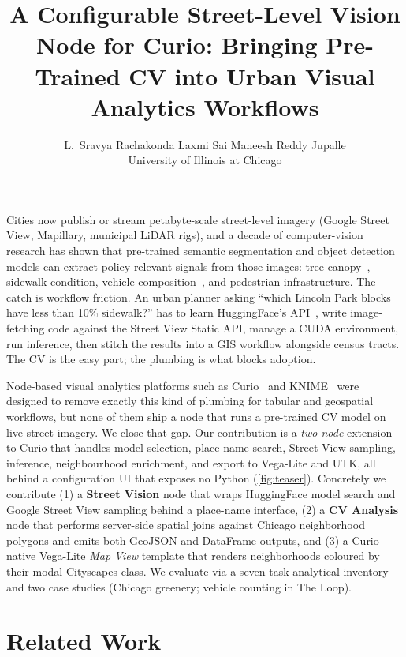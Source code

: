 \documentclass[journal]{vgtc}                     %
\title{A Configurable Street-Level Vision Node for Curio: Bringing Pre-Trained CV into Urban Visual Analytics Workflows}
\author{%
  L.~Sravya Rachakonda \hspace{2.5em} Laxmi Sai Maneesh Reddy Jupalle
  \\[4pt]
  \normalfont University of Illinois at Chicago
}
\begin{document}

\maketitle

Cities now publish or stream petabyte-scale street-level imagery (Google Street View, Mapillary, municipal LiDAR rigs), and a decade of computer-vision research has shown that pre-trained semantic segmentation and object detection models can extract policy-relevant signals from those images: tree canopy~\cite{Li2015AssessingStreetlevelUrban}, sidewalk condition, vehicle composition~\cite{Gebru2017UsingDeepLearning}, and pedestrian infrastructure. The catch is workflow friction. An urban planner asking ``which Lincoln Park blocks have less than 10\% sidewalk?'' has to learn HuggingFace's API~\cite{Wolf2020TransformersStateoftheartNatural}, write image-fetching code against the Street View Static API, manage a CUDA environment, run inference, then stitch the results into a GIS workflow alongside census tracts. The CV is the easy part; the plumbing is what blocks adoption.

Node-based visual analytics platforms such as Curio~\cite{Moreira2024CurioDataflowFramework} and KNIME~\cite{Berthold2009KNIMEKonstanzInformation} were designed to remove exactly this kind of plumbing for tabular and geospatial workflows, but none of them ship a node that runs a pre-trained CV model on live street imagery. We close that gap. Our contribution is a \emph{two-node} extension to Curio that handles model selection, place-name search, Street View sampling, inference, neighbourhood enrichment, and export to Vega-Lite and UTK, all behind a configuration UI that exposes no Python (\autoref{fig:teaser}). Concretely we contribute (1) a \textbf{Street Vision} node that wraps HuggingFace model search and Google Street View sampling behind a place-name interface, (2) a \textbf{CV Analysis} node that performs server-side spatial joins against Chicago neighborhood polygons and emits both GeoJSON and DataFrame outputs, and (3) a Curio-native Vega-Lite \emph{Map View} template that renders neighborhoods coloured by their modal Cityscapes class. We evaluate via a seven-task analytical inventory and two case studies (Chicago greenery; vehicle counting in The Loop).

\section{Related Work}
\label{sec:related}
\end{document}
